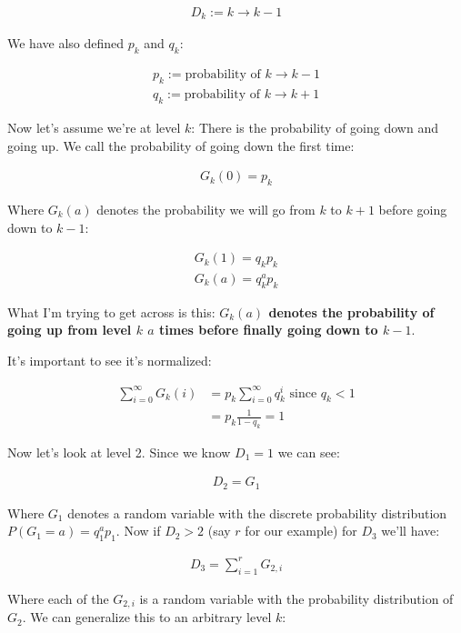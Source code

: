 \documentclass{article}
\begin{document}
\begin{gather}
  D_k := k \rightarrow k-1
\end{gather}

We have also defined \(p_k\) and \(q_k\):

\begin{gather}
  p_k := \text{probability of } k \rightarrow k-1\\
  q_k := \text{probability of } k \rightarrow k+1
\end{gather}

Now let's assume we're at level \(k\): There is the probability of going
down and going up. We call the probability of going down the first
time:

\begin{gather}
  G_k(0) = p_k
\end{gather}

Where \(G_k(a)\) denotes the probability we will go from \(k\) to \(k+1\) before
going down to \(k-1\):

\begin{gather}
  G_k(1) = q_kp_k\\
  G_k(a) = q_k^ap_k
\end{gather}

What I'm trying to get across is this: \textbf{\(G_k(a)\) denotes the
probability of going up from level \(k\) \(a\) times before finally going
down to \(k-1\)}.

It's important to see it's normalized:

\begin{align}
\sum_{i=0}^\infty G_k(i) &= p_k\sum_{i=0}^\infty q^i_k \text{ since } q_k<1 \\
  &= p_k \frac{1}{1-q_k} = 1
\end{align}

Now let's look at level 2. Since we know \(D_1=1\) we can see:

\begin{gather}
  D_2 = G_1
\end{gather}

Where \(G_1\) denotes a random variable with the discrete probability
distribution \(P(G_1=a) = q_1^a p_1\). Now if \(D_2 > 2\) (say \(r\) for our
example) for \(D_3\) we'll have:

\begin{gather}
  D_3 = \sum_{i=1}^r G_{2,i}
\end{gather}

Where each of the \(G_{2,i}\) is a random variable with the probability
distribution of \(G_2\). We can generalize this to an arbitrary level
\(k\):
\end{document}
